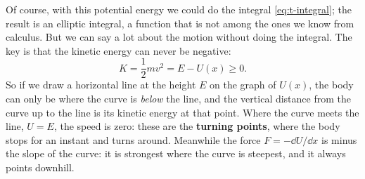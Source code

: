 \documentclass[11pt,a4paper]{article}
\begin{document}
Of course, with this potential energy we could do the integral \eqref{eq:t-integral}; the result is
an elliptic integral, a function that is not among the ones we know from calculus. But we can say a
lot about the motion without doing the integral. The key is that the kinetic energy can never be
negative:
\[
  K = \frac12 mv^2 = E - U(x) \geq 0 .
\]
So if we draw a horizontal line at the height $E$ on the graph of $U(x)$, the body can only be where
the curve is \emph{below} the line, and the vertical distance from the curve up to the line is its
kinetic energy at that point. Where the curve meets the line, $U = E$, the speed is zero: these are
the \textbf{turning points}, where the body stops for an instant and turns around. Meanwhile the
force $F = -\dd U/\dd x$ is minus the slope of the curve: it is strongest where the curve is
steepest, and it always points downhill.
\end{document}
